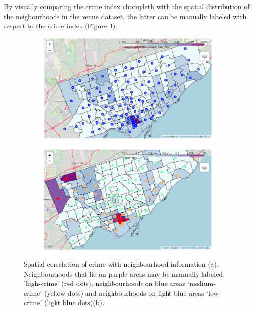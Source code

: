 \documentclass{article}
\begin{document}
By visually comparing the crime index choropleth with the spatial distribution of the neigbourhoods in the venue dataset, the latter can be manually labeled with respect to the crime index (Figure \ref{fig:manual}). 
\begin{figure}[ht]
    \begin{subfigure}[b]{0.47\textwidth}
        \includegraphics[width=\textwidth]{pics/manual.png}
        \caption{}
    \end{subfigure}\hfill
    \begin{subfigure}[b]{0.47\textwidth}
        \includegraphics[width=\textwidth]{pics/manual2.png}
        \caption{}
    \end{subfigure}
    \caption{Spatial correlation of crime with neighbourhood information (a). Neighbourhoods that lie on purple areas may be manually labeled 'high-crime' (red dots), neighbourhoods on blue areas `medium-crime' (yellow dots) and neighbourhoods on light blue areas `low-crime' (light blue dots)(b).}\label{fig:manual}
\end{figure}
\end{document}
